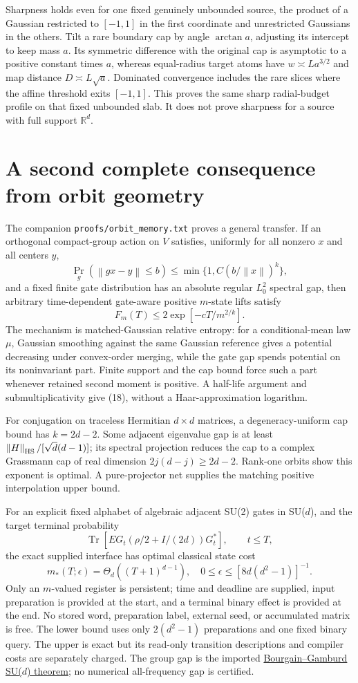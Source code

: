 \documentclass[11pt]{article}
\newcommand{\Tr}{\operatorname{Tr}}
\newcommand{\norm}[1]{\left\lVert#1\right\rVert}
\begin{document}
Sharpness holds even for one fixed genuinely unbounded source, the product of a Gaussian restricted to $[-1,1]$ in the first coordinate and unrestricted Gaussians in the others. Tilt a rare boundary cap by angle $\arctan a$, adjusting its intercept to keep mass $a$. Its symmetric difference with the original cap is asymptotic to a positive constant times $a$, whereas equal-radius target atoms have $w\asymp La^{3/2}$ and map distance $D\asymp L\sqrt a$. Dominated convergence includes the rare slices where the affine threshold exits $[-1,1]$. This proves the same sharp radial-budget profile on that fixed unbounded slab. It does not prove sharpness for a source with full support $\mathbb R^d$.

\section{A second complete consequence from orbit geometry}

The companion \texttt{proofs/orbit\_memory.txt} proves a general transfer. If an orthogonal compact-group action on $V$ satisfies, uniformly for all nonzero $x$ and all centers $y$,
\[
\Pr_g(\norm{gx-y}\le b)\le\min\{1,C(b/\norm{x})^k\},
\]
and a fixed finite gate distribution has an absolute regular $L^2_0$ spectral gap, then arbitrary time-dependent gate-aware positive $m$-state lifts satisfy
\[
F_m(T)\le2\exp[-cT/m^{2/k}].\tag{18}
\]
The mechanism is matched-Gaussian relative entropy: for a conditional-mean law $\mu$, Gaussian smoothing against the same Gaussian reference gives a potential decreasing under convex-order merging, while the gate gap spends potential on its noninvariant part. Finite support and the cap bound force such a part whenever retained second moment is positive. A half-life argument and submultiplicativity give (18), without a Haar-approximation logarithm.

For conjugation on traceless Hermitian $d\times d$ matrices, a degeneracy-uniform cap bound has $k=2d-2$. Some adjacent eigenvalue gap is at least $\norm H_{\rm HS}/[\sqrt d(d-1)]$; its spectral projection reduces the cap to a complex Grassmann cap of real dimension $2j(d-j)\ge2d-2$. Rank-one orbits show this exponent is optimal. A pure-projector net supplies the matching positive interpolation upper bound.

For an explicit fixed alphabet of algebraic adjacent SU(2) gates in SU($d$), and the target terminal probability
\[
\Tr\left[E G_t\left(\rho/2+I/(2d)\right)G_t^*\right],\qquad t\le T,
\]
the exact supplied interface has optimal classical state cost
\[
m_*(T;\epsilon)=\Theta_d((T+1)^{d-1}),\quad
0\le\epsilon\le[8d(d^2-1)]^{-1}.\tag{19}
\]
Only an $m$-valued register is persistent; time and deadline are supplied, input preparation is provided at the start, and a terminal binary effect is provided at the end. No stored word, preparation label, external seed, or accumulated matrix is free. The lower bound uses only $2(d^2-1)$ preparations and one fixed binary query. The upper is exact but its read-only transition descriptions and compiler costs are separately charged. The group gap is the imported \href{https://arxiv.org/abs/1108.6264}{Bourgain--Gamburd SU($d$) theorem}; no numerical all-frequency gap is certified.
\end{document}
